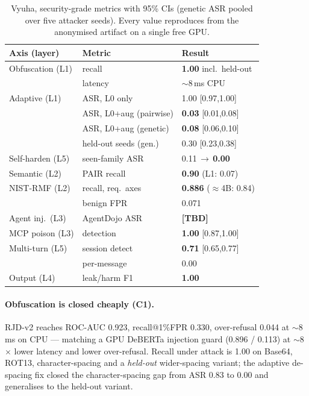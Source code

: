 \documentclass[11pt]{article}
\newcommand{\pending}{\textbf{[TBD]}}
\begin{document}
\begin{table}[t]
\centering\footnotesize\setlength{\tabcolsep}{4pt}
\begin{tabular}{@{}lll@{}}
\toprule
\textbf{Axis (layer)} & \textbf{Metric} & \textbf{Result} \\
\midrule
Obfuscation (L1) & recall & \textbf{1.00} incl.\ held-out \\
 & latency & $\sim$8\,ms CPU \\
Adaptive (L1) & ASR, L0 only & 1.00 [0.97,1.00] \\
 & ASR, L0+aug (pairwise) & \textbf{0.03} [0.01,0.08] \\
 & ASR, L0+aug (genetic) & \textbf{0.08} [0.06,0.10] \\
 & held-out seeds (gen.) & 0.30 [0.23,0.38] \\
Self-harden (L5) & seen-family ASR & 0.11\,$\rightarrow$\,\textbf{0.00} \\
Semantic (L2) & PAIR recall & \textbf{0.90} (L1: 0.07) \\
NIST-RMF (L2) & recall, req.\ axes & \textbf{0.886} ($\approx$4B: 0.84) \\
 & benign FPR & 0.071 \\
Agent inj.\ (L3) & AgentDojo ASR & \pending \\
MCP poison (L3) & detection & \textbf{1.00} [0.87,1.00] \\
Multi-turn (L5) & session detect & \textbf{0.71} [0.65,0.77] \\
 & per-message & 0.00 \\
Output (L4) & leak/harm F1 & \textbf{1.00} \\
\bottomrule
\end{tabular}
\caption{Vyuha, security-grade metrics with 95\% CIs (genetic ASR pooled over five attacker seeds).
Every value reproduces from the anonymised artifact on a single free GPU.}
\label{tab:main}
\end{table}

\paragraph{Obfuscation is closed cheaply (C1).} RJD-v2 reaches ROC-AUC 0.923, recall@1\%FPR 0.330,
over-refusal 0.044 at $\sim$8\,ms on CPU --- matching a GPU DeBERTa injection guard (0.896 / 0.113)
at $\sim$8$\times$ lower latency and lower over-refusal. Recall under attack is 1.00 on Base64, ROT13,
character-spacing and a \emph{held-out} wider-spacing variant; the adaptive de-spacing fix closed the
character-spacing gap from ASR 0.83 to 0.00 and generalises to the held-out variant.
\end{document}
